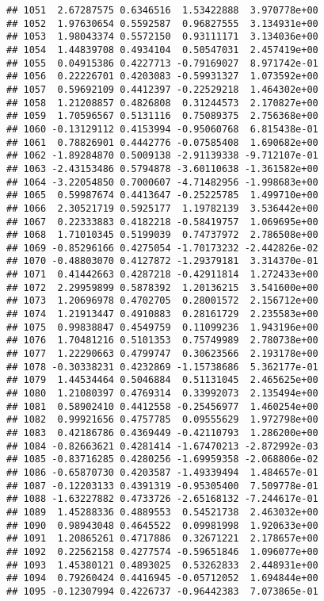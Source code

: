 \documentclass[
]{article}
\begin{document}
\begin{verbatim}
## 1051  2.67287575 0.6346516  1.53422888  3.970778e+00
## 1052  1.97630654 0.5592587  0.96827555  3.134931e+00
## 1053  1.98043374 0.5572150  0.93111171  3.134036e+00
## 1054  1.44839708 0.4934104  0.50547031  2.457419e+00
## 1055  0.04915386 0.4227713 -0.79169027  8.971742e-01
## 1056  0.22226701 0.4203083 -0.59931327  1.073592e+00
## 1057  0.59692109 0.4412397 -0.22529218  1.464302e+00
## 1058  1.21208857 0.4826808  0.31244573  2.170827e+00
## 1059  1.70596567 0.5131116  0.75089375  2.756368e+00
## 1060 -0.13129112 0.4153994 -0.95060768  6.815438e-01
## 1061  0.78826901 0.4442776 -0.07585408  1.690682e+00
## 1062 -1.89284870 0.5009138 -2.91139338 -9.712107e-01
## 1063 -2.43153486 0.5794878 -3.60110638 -1.361582e+00
## 1064 -3.22054850 0.7000607 -4.71482956 -1.998683e+00
## 1065  0.59987674 0.4413647 -0.25225785  1.499710e+00
## 1066  2.30521719 0.5925177  1.19782139  3.536442e+00
## 1067  0.22333883 0.4182218 -0.58419757  1.069695e+00
## 1068  1.71010345 0.5199039  0.74737972  2.786508e+00
## 1069 -0.85296166 0.4275054 -1.70173232 -2.442826e-02
## 1070 -0.48803070 0.4127872 -1.29379181  3.314370e-01
## 1071  0.41442663 0.4287218 -0.42911814  1.272433e+00
## 1072  2.29959899 0.5878392  1.20136215  3.541600e+00
## 1073  1.20696978 0.4702705  0.28001572  2.156712e+00
## 1074  1.21913447 0.4910883  0.28161729  2.235583e+00
## 1075  0.99838847 0.4549759  0.11099236  1.943196e+00
## 1076  1.70481216 0.5101353  0.75749989  2.780738e+00
## 1077  1.22290663 0.4799747  0.30623566  2.193178e+00
## 1078 -0.30338231 0.4232869 -1.15738686  5.362177e-01
## 1079  1.44534464 0.5046884  0.51131045  2.465625e+00
## 1080  1.21080397 0.4769314  0.33992073  2.135494e+00
## 1081  0.58902410 0.4412558 -0.25456977  1.460254e+00
## 1082  0.99921656 0.4757785  0.09555629  1.972798e+00
## 1083  0.42186786 0.4369449 -0.42110793  1.286200e+00
## 1084 -0.82663621 0.4281414 -1.67470213 -2.872992e-03
## 1085 -0.83716285 0.4280256 -1.69959358 -2.068806e-02
## 1086 -0.65870730 0.4203587 -1.49339494  1.484657e-01
## 1087 -0.12203133 0.4391319 -0.95305400  7.509778e-01
## 1088 -1.63227882 0.4733726 -2.65168132 -7.244617e-01
## 1089  1.45288336 0.4889553  0.54521738  2.463032e+00
## 1090  0.98943048 0.4645522  0.09981998  1.920633e+00
## 1091  1.20865261 0.4717886  0.32671221  2.178657e+00
## 1092  0.22562158 0.4277574 -0.59651846  1.096077e+00
## 1093  1.45380121 0.4893025  0.53262833  2.448931e+00
## 1094  0.79260424 0.4416945 -0.05712052  1.694844e+00
## 1095 -0.12307994 0.4226737 -0.96442383  7.073865e-01
\end{verbatim}
\end{document}
